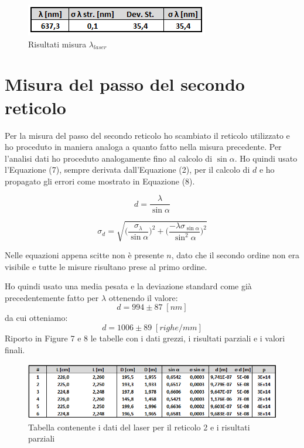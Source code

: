 \documentclass{article}
\begin{document}
\begin{figure}[h!]
  \centering
  \includegraphics[width=0.4\linewidth]{IM risultati laser 1}
  \caption{Risultati misura $\lambda_{laser}$}
\end{figure}




\pagebreak
\section{Misura del passo del secondo reticolo}
Per la misura del passo del secondo reticolo ho scambiato il reticolo utilizzato e ho proceduto in maniera analoga a quanto fatto nella misura precedente. Per l'analisi dati ho proceduto analogamente fino al calcolo di $\sin \alpha$. Ho quindi usato l'Equazione (7), sempre derivata dall'Equazione (2), per il calcolo di $d$ e ho propagato gli errori come mostrato in Equazione (8).

\begin{equation}
 d = \frac{\lambda}{\sin \alpha}
\end{equation}

\begin{equation}
 \sigma_d = \sqrt{ \bigg( \frac{\sigma_\lambda}{\sin \alpha} \bigg)^2 + \bigg( \frac{- \lambda \sigma_{\sin \alpha}}{\sin^2 \alpha} \bigg)^2 }
\end{equation}

Nelle equazioni appena scitte non è presente $n$, dato che il secondo ordine non era visibile e tutte le misure risultano prese al primo ordine.

\vspace{3mm}

Ho quindi usato una media pesata e la deviazione standard come già precedentemente fatto per $\lambda$ ottenendo il valore:
\[ d = 994 \pm 87 \; [nm] \]
da cui otteniamo:
\[ d = 1006 \pm 89 \; [righe/mm] \]
Riporto in Figure 7 e 8 le tabelle con i dati grezzi, i risultati parziali e i valori finali.

\begin{figure}[h!]
  \centering
  \includegraphics[width=1\linewidth]{IM tabella laser 2}
  \caption{Tabella contenente i dati del laser per il reticolo 2 e i risultati parziali}
\end{figure}
\end{document}
